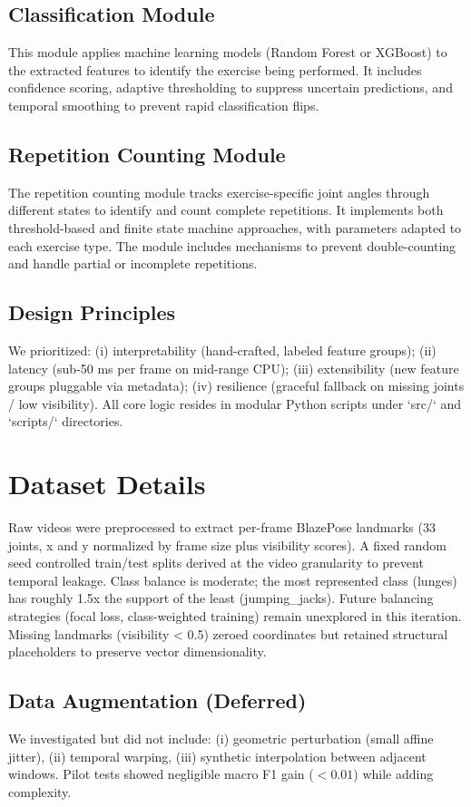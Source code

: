 \documentclass[conference]{IEEEtran}
\begin{document}
\subsection{Classification Module}
This module applies machine learning models (Random Forest or XGBoost) to the extracted features to identify the exercise being performed. It includes confidence scoring, adaptive thresholding to suppress uncertain predictions, and temporal smoothing to prevent rapid classification flips.

\subsection{Repetition Counting Module}
The repetition counting module tracks exercise-specific joint angles through different states to identify and count complete repetitions. It implements both threshold-based and finite state machine approaches, with parameters adapted to each exercise type. The module includes mechanisms to prevent double-counting and handle partial or incomplete repetitions.

\subsection{Design Principles}
We prioritized: (i) interpretability (hand-crafted, labeled feature groups); (ii) latency (sub-50 ms per frame on mid-range CPU); (iii) extensibility (new feature groups pluggable via metadata); (iv) resilience (graceful fallback on missing joints / low visibility). All core logic resides in modular Python scripts under `src/` and `scripts/` directories.

\section{Dataset Details}
Raw videos were preprocessed to extract per-frame BlazePose landmarks (33 joints, x and y normalized by frame size plus visibility scores). A fixed random seed controlled train/test splits derived at the video granularity to prevent temporal leakage. Class balance is moderate; the most represented class (lunges) has roughly 1.5x the support of the least (jumping\_jacks). Future balancing strategies (focal loss, class-weighted training) remain unexplored in this iteration. Missing landmarks (visibility < 0.5) zeroed coordinates but retained structural placeholders to preserve vector dimensionality.

\subsection{Data Augmentation (Deferred)}
We investigated but did not include: (i) geometric perturbation (small affine jitter), (ii) temporal warping, (iii) synthetic interpolation between adjacent windows. Pilot tests showed negligible macro F1 gain (\(<0.01\)) while adding complexity.
\end{document}
